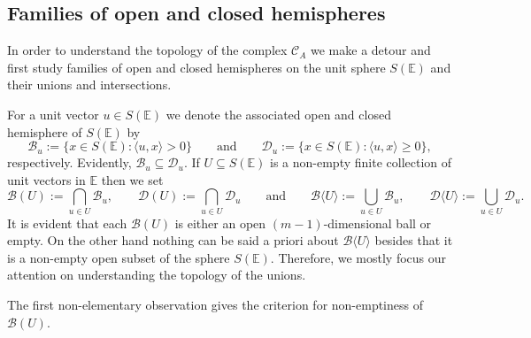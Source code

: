 \documentclass[a4paper,11pt,reqno, english]{amsart}
\theoremstyle{definition}
\theoremstyle{remark}
\newcommand\CC{\mathscr C}
\newcommand\E{\mathbb{E}}
\begin{document}
\medskip
\subsection{Families of open and closed hemispheres}
\label{subsec : Families of open and closed hemispheres}
In order to understand the topology of the complex $\CC_A$ we make a detour and first study families of open and closed hemispheres on the unit sphere $S(\E)$ and their unions and intersections.

\medskip
For a unit vector $u\in S(\E)$ we denote the associated open and closed hemisphere of $S(\E)$ by
\[
	\mathscr{B}_u:=\{x\in S(\E) : \langle u,x\rangle >0\}
	\qquad\text{and}\qquad
	\mathscr{D}_u:=\{x\in S(\E) : \langle u,x\rangle \geq 0\},
\]
respectively.
Evidently, $\mathscr{B}_u\subseteq \mathscr{D}_u$.
If $U\subseteq S(\E)$ is a non-empty finite collection of unit vectors in $\E$ then we set
\[
	\mathscr{B}(U):=\bigcap_{u\in U}\mathscr{B}_u,\qquad
	\mathscr{D}(U):=\bigcap_{u\in U}\mathscr{D}_u
	\qquad\text{and}\qquad
	\mathscr{B}\langle U\rangle :=\bigcup_{u\in U}\mathscr{B}_u,\qquad
	\mathscr{D}\langle U\rangle :=\bigcup_{u\in U}\mathscr{D}_u.
\]
It is evident that each $\mathscr{B}(U)$ is either an open $(m-1)$-dimensional ball or empty.
On the other hand nothing can be said a priori about $\mathscr{B}\langle U\rangle$ besides that it is a non-empty open subset of the sphere $S(\E)$.
Therefore, we mostly focus our attention on understanding the topology of the unions.

\medskip
The first non-elementary observation gives the criterion for non-emptiness of $\mathscr{B}(U)$.
\end{document}
